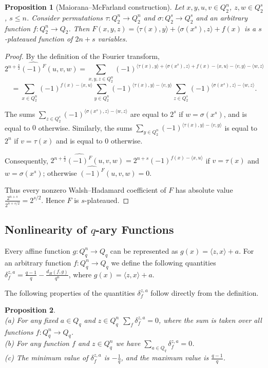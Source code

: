 \documentclass[11pt]{article}
\newtheorem{claim}{Proposition}[section]
\theoremstyle{definition}
\begin{document}
{{{\begin{claim}[Maiorana--McFarland construction]\label{cplat133}
Let $x,y,u,v\in Q^n_2$, $z,w\in Q^s_2$, $s\leq n$. Consider
permutations $\tau:Q^n_2\rightarrow Q^n_2$ and
$\sigma:Q^s_2\rightarrow Q^s_2$ and an arbitrary function
$f:Q^n_2\rightarrow Q_2$.  Then $F(x,y,z)=\langle\tau(x),y\rangle +
\langle\sigma(x^s),z\rangle +f(x)$ is a $s$-plateaued function
of $2n+s$ variables.
\end{claim}
\begin{proof}
By the definition of the Fourier transform,
$$2^{n+\frac{s}{2}}\widehat{(-1)^F}(u,v,w)= \sum\limits_{x,y,z\in
Q^n_2}(-1)^{\langle\tau(x),y\rangle + \langle\sigma(x^s),z\rangle
+f(x)-\langle x,u\rangle-\langle v,y\rangle -\langle w,z\rangle}$$
$$=\sum\limits_{x\in Q^n_2}(-1)^{f(x)-\langle
x,u\rangle}\sum\limits_{y\in
Q^n_2}(-1)^{\langle\tau(x),y\rangle-\langle
v,y\rangle}\sum\limits_{z\in Q^s_2}(-1)^{\langle\sigma(x^s),z\rangle
-\langle w,z\rangle}.$$

The sums $\sum\limits_{z\in
Q^s_2}(-1)^{\langle\sigma(x^s),z\rangle -\langle w,z\rangle}$ are equal to
$2^s$ if $w=\sigma(x^s)$, and is equal to $0$ otherwise.
Similarly,
 the sums
$\sum\limits_{y\in Q^n_2}(-1)^{\langle\tau(x),y\rangle -\langle
v,y\rangle}$ is  equal to $2^n$ if $v=\tau(x)$ and is  equal to $0$ otherwise.

Consequently,
$2^{n+\frac{s}{2}}\widehat{(-1)^F}(u,v,w)=2^{n+s}(-1)^{f(x)-\langle
x,u\rangle}$ if $v=\tau(x)$ and $w=\sigma(x^s)$; otherwise
$\widehat{(-1)^F}(u,v,w)=0$.

Thus every nonzero Walsh--Hadamard coefficient of $F$ has absolute value
$\frac{2^{n+s}}{2^{n+s/2}}
=2^{s/2}$.
Hence $F$ is $s$-plateaued.
\end{proof}


\subsection{Nonlinearity of $q$-ary Functions}

Every affine function $g:Q_q^n\rightarrow Q_q$ can be represented as
$g(x)=\langle z,x\rangle+a$. For an arbitrary function
$f:Q_q^n\rightarrow Q_q$ we define the following quantities
$\delta^{z,a}_f=\frac{q-1}{q}- \frac{d_H(f,g)}{q^n}$, where
$g(x)=\langle z,x\rangle+a$.

The following properties of the quantities
$\delta^{z,a}_f$ follow directly from the definition.
\begin{claim}\label{rbent22}\ \quad\\
{\rm (a)} For any fixed  $a\in Q_q$ and $z\in Q^n_q$ 
$\sum\limits_{f}\delta^{z,a}_f=0$, where the sum is taken over all
functions $f: Q^n_q\rightarrow Q_q$.\\
{\rm (b)}  For any function $f$ and $z\in Q^n_q$ we have $\sum\limits_{a\in
Q_q}\delta^{z,a}_f=0$.\\
{\rm (c)}  The minimum value of $\delta^{z,a}_f$ is
$-\frac{1}{q}$, and the maximum value is $\frac{q-1}{q}$.
\end{claim}

}}}
\end{document}
